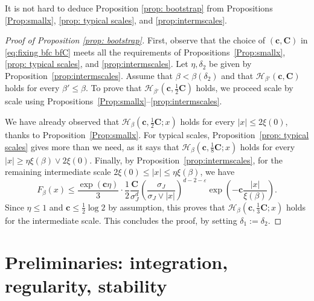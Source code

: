 \documentclass[11pt,a4paper]{article}
\numberwithin{equation}{section}
\theoremstyle{plain}
\theoremstyle{definition}
\newcommand\1{\mathds{1}}
\newcommand\bfc{\mathbf{c}}
\newcommand\bfC{\mathbf{C}}
\begin{document}
It is not hard to deduce Proposition \ref{prop: bootstrap} from Propositions \ref{Prop:smallx}, \ref{prop: typical scales}, and \ref{prop:intermscales}.

\begin{proof}[Proof of Proposition \textup{\ref{prop: bootstrap}}]
First,
observe that the choice of $(\bfc,\bfC)$ in \eqref{eq:fixing bfc bfC} meets all the requirements of Propositions~\ref{Prop:smallx}, \ref{prop: typical scales}, and \ref{prop:intermscales}. Let $\eta,\delta_2$ be given by Proposition~\ref{prop:intermscales}. Assume that $\beta<\beta(\delta_2)$ and that $\mathcal H_{\beta'}(\bfc,\bfC)$ holds for every $\beta'\leq \beta$.
To prove that $\mathcal H_{\beta'}(\bfc,\frac 12 \bfC)$ holds,
we proceed scale by scale using
Propositions~\ref{Prop:smallx}--\ref{prop:intermscales}.

We have already observed  that $\mathcal H_{\beta}(\bfc,\tfrac{1}{2}\bfC;x)$ holds for every $|x|\leq 2\xi(0)$,
thanks to Proposition~\ref{Prop:smallx}.
For typical scales, Proposition~\ref{prop: typical scales} gives more than we need, as it says that $\mathcal H_{\beta}(\bfc,\tfrac{1}{8}\bfC;x)$ holds for every
$|x|\geq \eta \xi(\beta)\vee 2\xi(0)$.
Finally, by Proposition~\ref{prop:intermscales}, for the remaining intermediate scale $2\xi(0)\leq |x|\leq \eta\xi(\beta)$, we have
\begin{equation}
	F_\beta(x)
    \leq \frac{\exp(\bfc \eta)}{3} \cdot \frac{1}{2}\frac{\bfC}{\sigma^d_J}
    \left(\frac{\sigma_J}{\sigma_J\vee |x|}\right)^{d-2-\varepsilon}
    \exp\left(-\bfc \frac{|x|}{\xi(\beta)}\right).
\end{equation}
Since $\eta\leq 1$ and $\bfc\leq \tfrac{1}{2}\log 2$ by assumption,
this proves that $\mathcal H_{\beta}(\bfc,\tfrac{1}{3}\bfC;x)$ holds
for the intermediate scale.
This concludes the proof, by setting $\delta_1:=\delta_2$.
\end{proof}



\section{Preliminaries: integration, regularity, stability}\label{sec:prelim}
\end{document}
